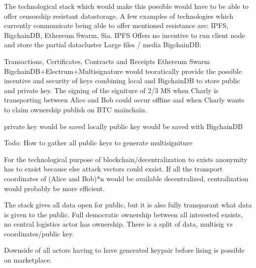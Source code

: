\documentclass[Nomencl]{SelimArticle}
\begin{document}
The technological stack which would make this possible would have to be able to offer censorship resistant datastorage. A few examples of technologies which currently communicate being able to offer mentioned resistance are: IPFS, BigchainDB, Ethereum Swarm, Sia.
IPFS
Offers no incentive to run client node and store the partial datacluster
Large files / media
BigchainDB:

Transactions, Certificates, Contracts and Receipts
Ethereum Swarm
BigchainDB+Electrum+Multisignature would teoratically provide the possible incentive and security of keys combining local and BigchainDB to store public and private key. The signing of the signiture of 2/3 MS when Charly is transporting between Alice and Bob could occur offline and when Charly wants to claim ownership publish on BTC mainchain.

private key would be saved locally
public key would be saved with BigchainDB

Todo: How to gather all public keys to generate multisigniture

For the technological purpose of blockchain/decentralization to exists anonymity has to exsist because else attack vectors could exsist. If all the transport coordinates of (Alice and Bob)*n would be available decentralized, centralization would probably be more efficient.

The stack gives all data open for public, but it is also fully transparant what data is given to the public. Full democratic ownership between all interested exsists, no central logistics actor has ownership. There is a split of data, multisig vs coordinates/public key.

Downside of all actors having to have generated keypair before lising is possible on marketplace.



\end{document}
